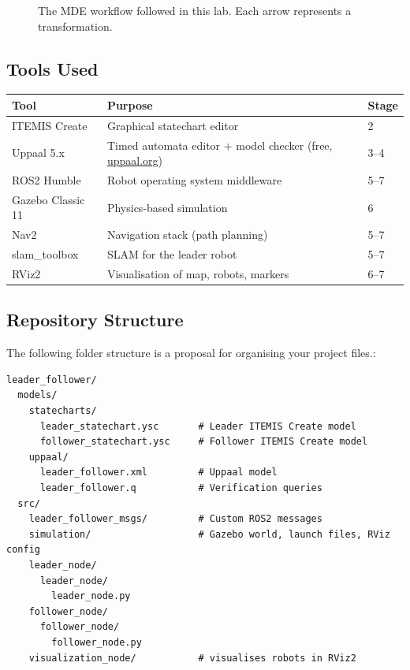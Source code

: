 \documentclass[11pt, a4paper]{article}
\begin{document}
\begin{figure}[H]
\caption{The MDE workflow followed in this lab. Each arrow represents a transformation.}
\label{fig:mde_workflow}
\end{figure}

\subsection{Tools Used}

\begin{center}
\begin{tabularx}{0.92\textwidth}{lXl}
\toprule
\textbf{Tool} & \textbf{Purpose} & \textbf{Stage} \\
\midrule
ITEMIS Create  & Graphical statechart editor      & 2 \\
Uppaal 5.x     & Timed automata editor + model checker (free, \url{uppaal.org}) & 3–4 \\
ROS2 Humble    & Robot operating system middleware & 5–7 \\
Gazebo Classic 11 & Physics-based simulation & 6 \\
Nav2           & Navigation stack (path planning) & 5–7 \\
slam\_toolbox  & SLAM for the leader robot & 5–7 \\
RViz2          & Visualisation of map, robots, markers & 6–7 \\
\bottomrule
\end{tabularx}
\end{center}

\subsection{Repository Structure}

The following folder structure is a proposal for organising your project files.:

\begin{lstlisting}[style=shellcode]
leader_follower/
  models/
    statecharts/
      leader_statechart.ysc       # Leader ITEMIS Create model
      follower_statechart.ysc     # Follower ITEMIS Create model
    uppaal/
      leader_follower.xml         # Uppaal model 
      leader_follower.q           # Verification queries
  src/
    leader_follower_msgs/         # Custom ROS2 messages 
    simulation/                   # Gazebo world, launch files, RViz config
    leader_node/
      leader_node/
        leader_node.py            
    follower_node/
      follower_node/
        follower_node.py          
    visualization_node/           # visualises robots in RViz2
\end{lstlisting}
\end{document}
